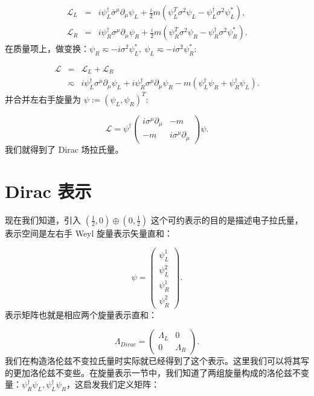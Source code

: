 \documentclass[10pt,UTF8]{ctexart}
\begin{document}
\begin{eqnarray}
\mathcal{L}_{L} & = & i\psi_{L}^{\dagger}\bar{\sigma}^{\mu}\partial_{\mu}\psi_{L}+\frac{i}{2}m\left(\psi_{L}^{T}\sigma^{2}\psi_{L}-\psi_{L}^{\dagger}\sigma^{2}\psi_{L}^{*}\right),\\
\mathcal{L}_{R} & = & i\psi_{R}^{\dagger}\sigma^{\mu}\partial_{\mu}\psi_{R}+\frac{i}{2}m\left(\psi_{R}^{T}\sigma^{2}\psi_{R}-\psi_{R}^{\dagger}\sigma^{2}\psi_{R}^{*}\right).
\end{eqnarray}
在质量项上，做变换：$\psi_{R}\eqsim-i\sigma^{2}\psi_{L}^{*},\ \psi_{L}\eqsim-i\sigma^{2}\psi_{R}^{*}$:

\begin{eqnarray}
\mathcal{L} & = & \mathcal{L}_{L}+\mathcal{L}_{R}\nonumber \\
 & \eqsim & i\psi_{L}^{\dagger}\sigma^{\mu}\partial_{\mu}\psi_{L}+i\psi_{R}^{\dagger}\sigma^{\mu}\partial_{\mu}\psi_{R}-m\left(\psi_{L}^{\dagger}\psi_{R}+\psi_{R}^{\dagger}\psi_{L}\right).
\end{eqnarray}
并合并左右手旋量为 $\psi:=\left(\psi_{L},\psi_{R}\right)^{T}$:

\begin{equation}
\mathcal{L}=\psi^{\dagger}\left(\begin{array}{cc}
i\sigma^{\mu}\partial_{\mu} & -m\\
-m & i\sigma^{\mu}\partial_{\mu}
\end{array}\right)\psi.
\end{equation}
我们就得到了 Dirac 场拉氏量。

\section*{Dirac 表示}
\noindent
现在我们知道，引入 $\left(\frac{1}{2},0\right)\oplus\left(0,\frac{1}{2}\right)$
这个可约表示的目的是描述电子拉氏量，表示空间是左右手 Weyl 旋量表示矢量直和：

\begin{equation}
\psi=\left(\begin{array}{c}
\psi_{L}^{1}\\
\psi_{L}^{2}\\
\psi_{R}^{1}\\
\psi_{R}^{2}
\end{array}\right).
\end{equation}
表示矩阵也就是相应两个旋量表示直和：

\begin{equation}
\Lambda_{Dirac}=\left(\begin{array}{cc}
\Lambda_{L} & 0\\
0 & \Lambda_{R}
\end{array}\right).
\end{equation}
我们在构造洛伦兹不变拉氏量时实际就已经得到了这个表示。这里我们可以将其写的更加洛伦兹不变些。在旋量表示一节中，我们知道了两组旋量构成的洛伦兹不变量：$\psi_{R}^{\dagger}\psi_{L},\psi_{L}^{\dagger}\psi_{R}$，这启发我们定义矩阵：
\end{document}
